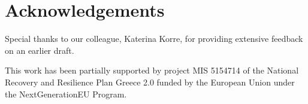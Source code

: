 %
\section*{Acknowledgements}

Special thanks to our colleague, Katerina Korre, for providing extensive feedback on an earlier draft.

This work has been partially supported by project MIS 5154714 of the National Recovery and Resilience Plan Greece 2.0 funded by the European Union under the NextGenerationEU Program.